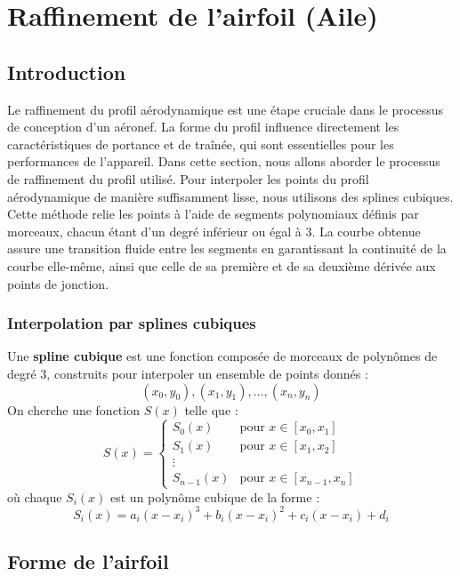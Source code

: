 \section{Raffinement de l'airfoil (Aile)} 
\label{sec:airfoil}
\subsection{Introduction}
Le raffinement du profil aérodynamique est une étape cruciale dans le processus de conception d’un aéronef. La forme du profil influence directement les caractéristiques de portance et de traînée, qui sont essentielles pour les performances de l’appareil. Dans cette section, nous allons aborder le processus de raffinement du profil utilisé.
Pour interpoler les points du profil aérodynamique de manière suffisamment lisse, nous utilisons des splines cubiques. Cette méthode relie les points à l’aide de segments polynomiaux définis par morceaux, chacun étant d’un degré inférieur ou égal à 3. La courbe obtenue assure une transition fluide entre les segments en garantissant la continuité de la courbe elle-même, ainsi que celle de sa première et de sa deuxième dérivée aux points de jonction.

\subsubsection*{Interpolation par splines cubiques}
\label{sec:cubic_spline_interpolation}
Une \textbf{spline cubique} est une fonction composée de morceaux de polynômes de degré 3, construits pour interpoler un ensemble de points donnés :
\[
(x_0, y_0), (x_1, y_1), \dots, (x_n, y_n)
\]
On cherche une fonction $S(x)$ telle que :
\[
S(x) =
\begin{cases}
S_0(x) & \text{pour } x \in [x_0, x_1] \\
S_1(x) & \text{pour } x \in [x_1, x_2] \\
\vdots \\
S_{n-1}(x) & \text{pour } x \in [x_{n-1}, x_n]
\end{cases}
\]
où chaque $S_i(x)$ est un polynôme cubique de la forme :
\[
S_i(x) = a_i(x - x_i)^3 + b_i(x - x_i)^2 + c_i(x - x_i) + d_i
\]

\subsection{Forme de l'airfoil}

